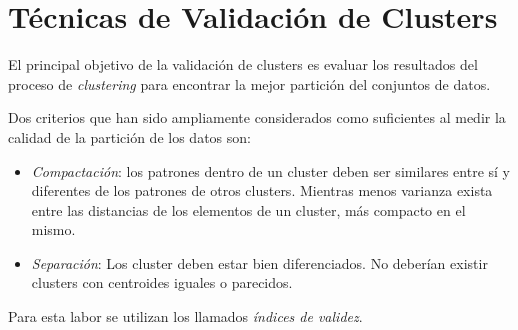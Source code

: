 \section{Técnicas de Validación de Clusters} \label{sect:fobjetivo}


    El principal objetivo de la validación de clusters es evaluar los resultados
del proceso de \emph{clustering} para encontrar la mejor partición del conjuntos
de datos.

    Dos criterios que han sido ampliamente considerados como suficientes al
medir la calidad de la partición de los datos son:
\begin{itemize}
    \item \emph{Compactación}: los patrones dentro de un cluster deben ser
similares entre sí y diferentes de los patrones de otros clusters. Mientras
menos varianza exista entre las distancias de los elementos de un cluster, más
compacto en el mismo.
    \item \emph{Separación}: Los cluster deben estar bien diferenciados. No
deberían existir clusters con centroides iguales o parecidos.
\end{itemize}

Para esta labor se utilizan los llamados \emph{índices de validez}.

